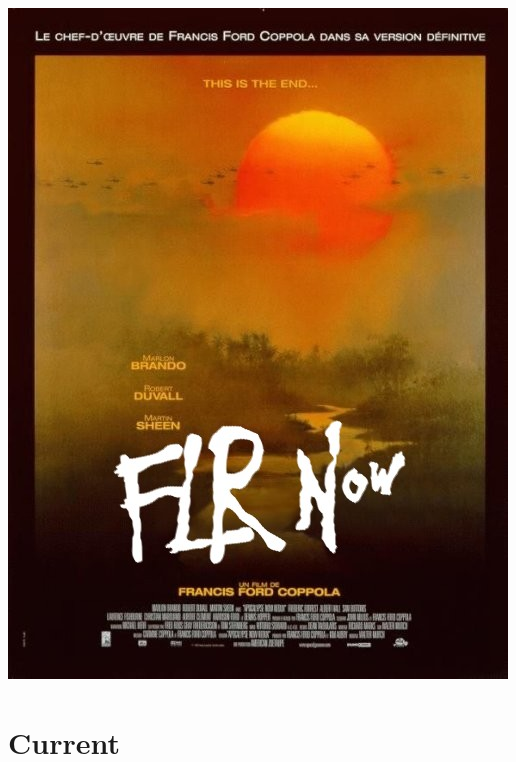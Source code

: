 \documentclass[]{article}
\begin{document}
\centering
\includegraphics[keepaspectratio, height=0.85\textheight]{graphics/flr30.png}

\section{Current}\label{current}
\end{document}
